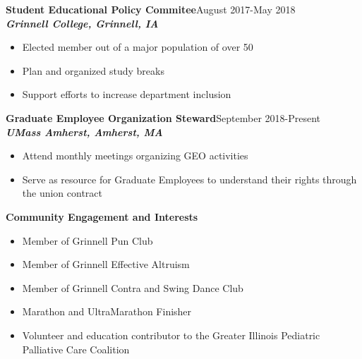 \documentclass[9pt]{extarticle}
\begin{document}
\textbf{Student Educational Policy Commitee}\hfill August 2017-May 2018\\
\textbf{\textit{Grinnell College, Grinnell, IA}}
\begin{itemize}
\item Elected member out of a major population of over 50
\item Plan and organized study breaks
\item Support efforts to increase department inclusion
\end{itemize}

\textbf{Graduate Employee Organization Steward}\hfill September 2018-Present\\
\textbf{\textit{UMass Amherst, Amherst, MA}}
\begin{itemize}
\item Attend monthly meetings organizing GEO activities
\item Serve as resource for Graduate Employees to understand their
  rights through the union contract
\end{itemize}


\begin{large}
\begin{center}\textbf{Community Engagement and Interests}
\end{center}
\end{large}
\begin{itemize}
\item Member of Grinnell Pun Club
\item Member of Grinnell Effective Altruism
\item Member of Grinnell Contra and Swing Dance Club
\item Marathon and UltraMarathon Finisher
\item Volunteer and education contributor to the Greater Illinois
  Pediatric Palliative Care Coalition
\end{itemize}
\end{document}
